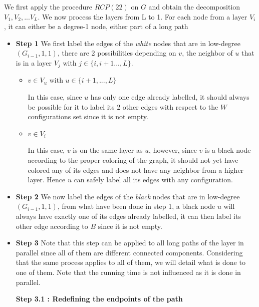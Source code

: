We first apply the procedure $RCP(22)$ on $G$ and obtain the decomposition $V_1,V_2,...V_L$. We now process the layers from L to 1.
For each node from a layer $V_i$, it can either be a degree-1 node, either part of a long path
\begin{itemize}

    \item \textbf{Step 1}
    We first label the edges of the \textit{white} nodes that are in low-degree$(G_{i-1},1,1)$, there are 2 possibilities depending on $v$, the neighbor of $u$ that is in a layer $V_j$ with $j \in \{i,i+1...,L\}$.
    \begin{itemize}
        \item $v \in V_u$ with $u \in \{i+1,...,L\}$
        
        In this case, since $u$ has only one edge already labelled, it should always be possible for it to label its 2 other edges with respect to the $W$ configurations set since it is not empty.
        
        \item $v \in V_i$
        
        In this case, $v$ is on the same layer as $u$, however, since $v$ is a black node according to the proper coloring of the graph, it should not yet have colored any of its edges and does not have any neighbor from a higher layer. Hence $u$ can safely label all its edges with any configuration.
    \end{itemize}
    
    \item \textbf{Step 2}
    We now label the edges of the \textit{black} nodes that are in low-degree $(G_{i-1},1,1)$, from what have been done in step 1, a black node $u$ will always have exactly one of its edges already labelled, it can then label its other edge according to $B$ since it is not empty.
    
    \item \textbf{Step 3}
    Note that this step can be applied to all long paths of the layer in parallel since all of them are different connected components. Considering that the same process applies to all of them, we will detail what is done to one of them. Note that the running time is not influenced as it is done in parallel.
    
    \textbf{Step 3.1 : Redefining the endpoints of the path}
    

\end{itemize}
